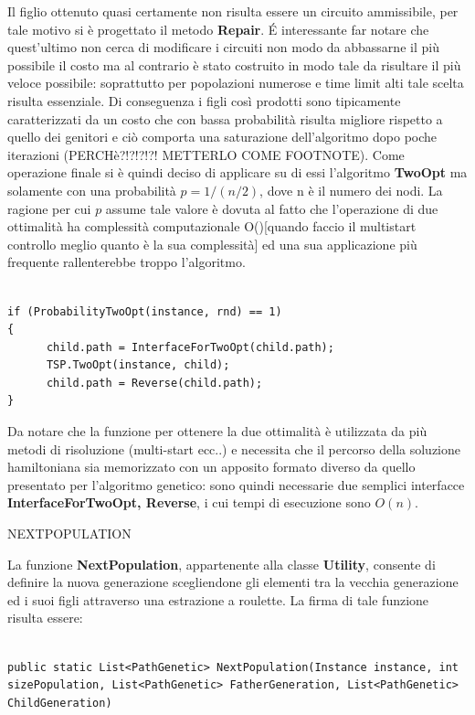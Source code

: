 \documentclass[11pt]{article}
\begin{document}
Il figlio ottenuto quasi certamente non risulta essere un circuito ammissibile, per tale motivo si è progettato il metodo \textbf{Repair}. \'E interessante far notare che quest'ultimo non cerca di modificare i circuiti non modo da abbassarne il più possibile il costo ma al contrario è stato costruito in modo tale da risultare il più veloce possibile: soprattutto per popolazioni numerose e time limit alti tale scelta risulta essenziale. Di conseguenza i figli così prodotti sono tipicamente caratterizzati da un costo che con bassa probabilità risulta migliore rispetto a quello dei genitori e ciò comporta una saturazione dell'algoritmo dopo poche iterazioni (PERCHè?!?!?!?! METTERLO COME FOOTNOTE). Come operazione finale si è quindi deciso di applicare su di essi l'algoritmo \textbf{TwoOpt} ma solamente con una probabilità $p = 1 / (n/2)$, dove n è il numero dei nodi. La ragione per cui $p$ assume tale valore è dovuta al fatto che l'operazione di due ottimalità ha complessità computazionale O()[quando faccio il multistart controllo meglio quanto è la sua complessità] ed una sua applicazione più frequente rallenterebbe troppo l'algoritmo.

\begin{lstlisting}

if (ProbabilityTwoOpt(instance, rnd) == 1)
{
      child.path = InterfaceForTwoOpt(child.path);
      TSP.TwoOpt(instance, child);
      child.path = Reverse(child.path);
}

\end{lstlisting}

Da notare che la funzione per ottenere la due ottimalità è utilizzata da più metodi di risoluzione (multi-start ecc..) e necessita che il percorso della soluzione hamiltoniana sia memorizzato con un apposito formato diverso da quello presentato per l'algoritmo genetico: sono quindi necessarie due semplici interfacce \textbf{InterfaceForTwoOpt, Reverse}, i cui tempi di esecuzione sono $O(n)$.

\vspace{2\baselineskip}
NEXTPOPULATION
\vspace{2\baselineskip}

La funzione \textbf{NextPopulation}, appartenente alla classe \textbf{Utility}, consente di definire la nuova generazione scegliendone gli elementi tra la vecchia generazione ed i suoi figli attraverso una estrazione a roulette. La firma di tale funzione risulta essere:

\begin{lstlisting}

public static List<PathGenetic> NextPopulation(Instance instance, int sizePopulation, List<PathGenetic> FatherGeneration, List<PathGenetic> ChildGeneration)

\end{lstlisting}
\end{document}
